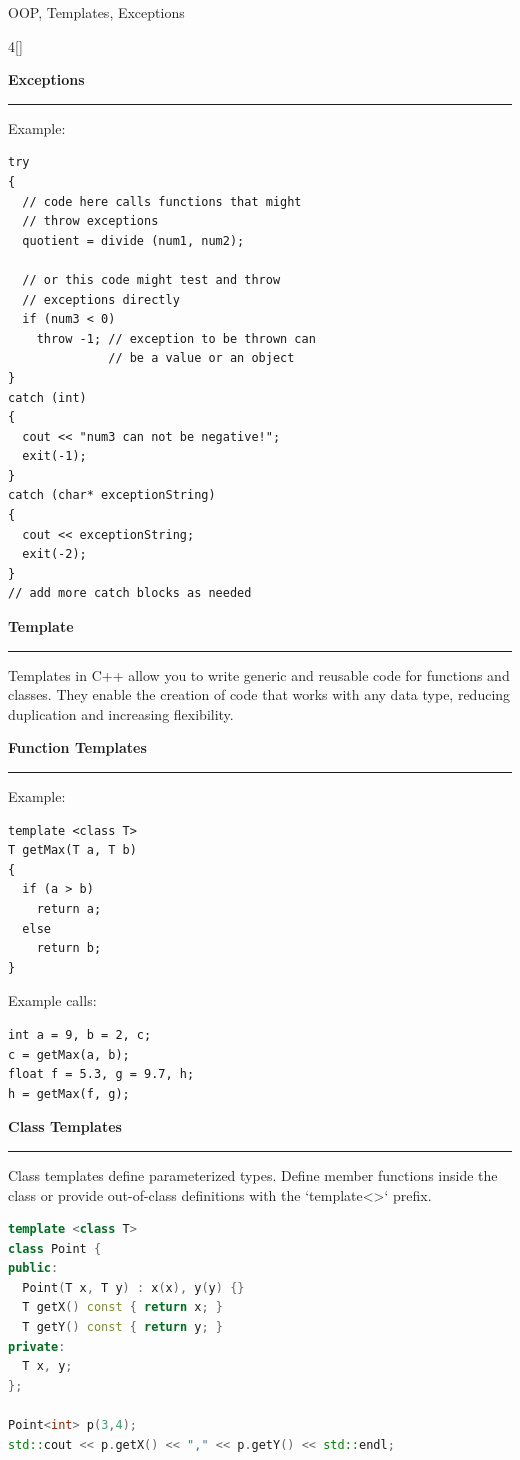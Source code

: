 \documentclass[final]{beamer}
\renewcommand{\section}[1]{%
  \par\vspace{1em}%
  {\noindent\Large\bfseries #1\par}%
  \vspace{0.5em}\hrule\vspace{1em}%
}
\renewcommand{\subsection}[1]{%
  \par\vspace{1em}%
  {\noindent\large\bfseries #1\par}%
  \vspace{0.5em}\hrule\vspace{1em}%
}
\begin{document}
\begin{frame}[t,fragile]{OOP, Templates, Exceptions}
\begin{multicols}{4}[\setlength{\columnsep}{1.5cm}]
 \subsection{Exceptions}
Example:
\begin{lstlisting}
try
{
  // code here calls functions that might
  // throw exceptions
  quotient = divide (num1, num2);

  // or this code might test and throw
  // exceptions directly
  if (num3 < 0)
    throw -1; // exception to be thrown can
              // be a value or an object
}
catch (int)
{
  cout << "num3 can not be negative!";
  exit(-1);
}
catch (char* exceptionString)
{
  cout << exceptionString;
  exit(-2);
}
// add more catch blocks as needed
\end{lstlisting}
\section{Template}
Templates in C++ allow you to write generic and reusable code for functions and classes. They enable the creation of code that works with any data type, reducing duplication and increasing flexibility.
 \subsection{Function Templates}
Example:
\begin{lstlisting}
template <class T>
T getMax(T a, T b)
{
  if (a > b)
    return a;
  else
    return b;
}
\end{lstlisting}
Example calls:
\begin{lstlisting}
int a = 9, b = 2, c;
c = getMax(a, b);
float f = 5.3, g = 9.7, h;
h = getMax(f, g);
\end{lstlisting}


\subsection{Class Templates}
Class templates define parameterized types. Define member functions inside the class or provide out-of-class definitions with the `template<>` prefix.
\begin{lstlisting}[language=C++]
template <class T>
class Point {
public:
  Point(T x, T y) : x(x), y(y) {}
  T getX() const { return x; }
  T getY() const { return y; }
private:
  T x, y;
};

Point<int> p(3,4);
std::cout << p.getX() << "," << p.getY() << std::endl;
\end{lstlisting}


\end{multicols}
\end{frame}
\end{document}
